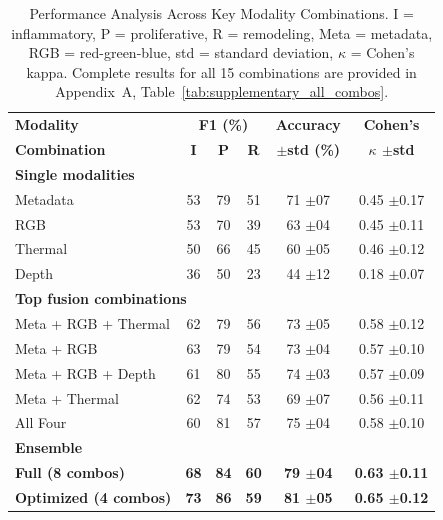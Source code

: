 \documentclass[journal,twoside,web]{ieeecolor}
\begin{document}
\begin{table}[!t]
\renewcommand{\arraystretch}{1.3}
\caption{Performance Analysis Across Key Modality Combinations. I = inflammatory, P = proliferative, R = remodeling, Meta = metadata, RGB = red-green-blue, std = standard deviation, $\kappa$ = Cohen's kappa. Complete results for all 15 combinations are provided in Appendix~A, Table~\ref{tab:supplementary_all_combos}.}
\label{tab:comprehensive_results}
\centering
\begin{tabular}{|l|c|c|c|c|c|}
\hline
\textbf{Modality} & \multicolumn{3}{c|}{\textbf{F1 (\%)}} & \textbf{Accuracy} & \textbf{Cohen's} \\
\textbf{Combination} & \textbf{I} & \textbf{P} & \textbf{R} & \textbf{$\pm$std (\%)} & \textbf{$\kappa$ $\pm$std} \\
\hline
\multicolumn{6}{|l|}{\textbf{Single modalities}} \\
\hline
Metadata & 53 & 79 & 51 & 71 $\pm$07 & 0.45 $\pm$0.17 \\
RGB & 53 & 70 & 39 & 63 $\pm$04 & 0.45 $\pm$0.11 \\
Thermal & 50 & 66 & 45 & 60 $\pm$05 & 0.46 $\pm$0.12 \\
Depth & 36 & 50 & 23 & 44 $\pm$12 & 0.18 $\pm$0.07 \\
\hline
\multicolumn{6}{|l|}{\textbf{Top fusion combinations}} \\
\hline
Meta + RGB + Thermal & 62 & 79 & 56 & 73 $\pm$05 & 0.58 $\pm$0.12 \\
Meta + RGB & 63 & 79 & 54 & 73 $\pm$04 & 0.57 $\pm$0.10 \\
Meta + RGB + Depth & 61 & 80 & 55 & 74 $\pm$03 & 0.57 $\pm$0.09 \\
Meta + Thermal & 62 & 74 & 53 & 69 $\pm$07 & 0.56 $\pm$0.11 \\
All Four & 60 & 81 & 57 & 75 $\pm$04 & 0.58 $\pm$0.10 \\
\hline
\multicolumn{6}{|l|}{\textbf{Ensemble}} \\
\hline
\textbf{Full (8 combos)} & \textbf{68} & \textbf{84} & \textbf{60} & \textbf{79 $\pm$04} & \textbf{0.63 $\pm$0.11} \\
\textbf{Optimized (4 combos)} & \textbf{73} & \textbf{86} & \textbf{59} & \textbf{81 $\pm$05} & \textbf{0.65 $\pm$0.12} \\
\hline
\end{tabular}
\end{table}
\end{document}
